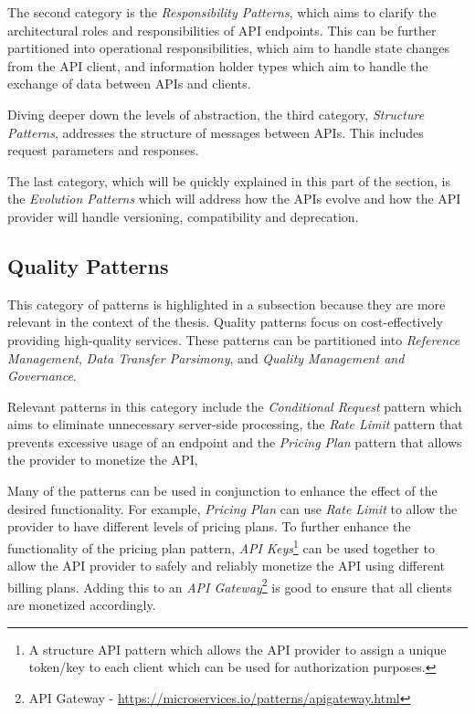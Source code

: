 The second category is the \emph{Responsibility Patterns}, which aims to clarify the architectural roles and responsibilities of API endpoints.
This can be further partitioned into operational responsibilities, which aim to handle state changes from the API client, and information holder types which aim to handle the exchange of data between APIs and clients.

Diving deeper down the levels of abstraction, the third category, \emph{Structure Patterns}, addresses the structure of messages between APIs. This includes request parameters and responses.

The last category, which will be quickly explained in this part of the section, is the \emph{Evolution Patterns} which will address how the APIs evolve and how the API provider will handle versioning, compatibility and deprecation.

\subsection{Quality Patterns}
This category of patterns is highlighted in a subsection because they are more relevant in the context of the thesis.
Quality patterns focus on cost-effectively providing high-quality services. These patterns can be partitioned into \emph{Reference Management}, \emph{Data Transfer Parsimony}, and \emph{Quality Management and Governance}.

Relevant patterns in this category include the \emph{Conditional Request} pattern which aims to eliminate unnecessary server-side 
processing, the \emph{Rate Limit} pattern that prevents excessive usage of an endpoint and the \emph{Pricing Plan} pattern that allows the provider to monetize the API,

Many of the patterns can be used in conjunction to enhance the effect of the desired functionality. For example, \emph{Pricing Plan} can use \emph{Rate Limit} to allow the provider to have different levels of pricing plans.
To further enhance the functionality of the pricing plan pattern, \emph{API Keys}\footnote{A structure API pattern which allows the API provider
to assign a unique token/key to each client which can be used for authorization purposes.} can be used together to allow the API provider to safely and reliably monetize the API using different billing plans. 
Adding this to an \emph{API Gateway}\footnote{API Gateway - \url{https://microservices.io/patterns/apigateway.html}} is good to ensure that all clients are monetized accordingly.

